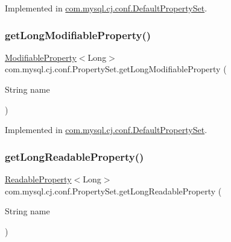 Implemented in \mbox{\hyperlink{classcom_1_1mysql_1_1cj_1_1conf_1_1_default_property_set_a58ff54d9bc14d56562767d4cec5c510e}{com.\+mysql.\+cj.\+conf.\+Default\+Property\+Set}}.

\mbox{\label{interfacecom_1_1mysql_1_1cj_1_1conf_1_1_property_set_a19570f2efd6239cdacbf6628113b574f}} 
\subsubsection{\texorpdfstring{get\+Long\+Modifiable\+Property()}{getLongModifiableProperty()}}
{\footnotesize\ttfamily \mbox{\hyperlink{interfacecom_1_1mysql_1_1cj_1_1conf_1_1_modifiable_property}{Modifiable\+Property}}$<$Long$>$ com.\+mysql.\+cj.\+conf.\+Property\+Set.\+get\+Long\+Modifiable\+Property (\begin{DoxyParamCaption}\item[{String}]{name }\end{DoxyParamCaption})}



Implemented in \mbox{\hyperlink{classcom_1_1mysql_1_1cj_1_1conf_1_1_default_property_set_a5099422aad8cc1a99c4b0f037d661237}{com.\+mysql.\+cj.\+conf.\+Default\+Property\+Set}}.

\mbox{\label{interfacecom_1_1mysql_1_1cj_1_1conf_1_1_property_set_a33a32415fb023b197006630115166ad4}} 
\subsubsection{\texorpdfstring{get\+Long\+Readable\+Property()}{getLongReadableProperty()}}
{\footnotesize\ttfamily \mbox{\hyperlink{interfacecom_1_1mysql_1_1cj_1_1conf_1_1_readable_property}{Readable\+Property}}$<$Long$>$ com.\+mysql.\+cj.\+conf.\+Property\+Set.\+get\+Long\+Readable\+Property (\begin{DoxyParamCaption}\item[{String}]{name }\end{DoxyParamCaption})}



